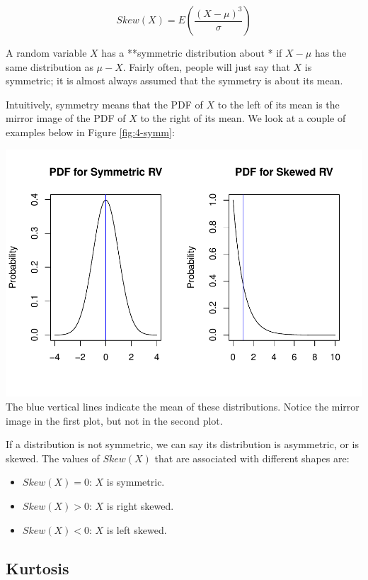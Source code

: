 \documentclass[
]{book}
\providecommand{\tightlist}{%
  \setlength{\itemsep}{0pt}\setlength{\parskip}{0pt}}
\begin{document}
\begin{equation} 
Skew(X) = E \left(\frac{(X-\mu)^3}{\sigma} \right)
\label{eq:4-skew}
\end{equation}

A random variable \(X\) has a **symmetric distribution about \mu** if \(X - \mu\) has the same distribution as \(\mu - X\). Fairly often, people will just say that \(X\) is symmetric; it is almost always assumed that the symmetry is about its mean.

Intuitively, symmetry means that the PDF of \(X\) to the left of its mean is the mirror image of the PDF of \(X\) to the right of its mean. We look at a couple of examples below in Figure \ref{fig:4-symm}:

\includegraphics{bookdown-demo_files/figure-latex/4-symm-1.pdf}
The blue vertical lines indicate the mean of these distributions. Notice the mirror image in the first plot, but not in the second plot.

If a distribution is not symmetric, we can say its distribution is asymmetric, or is skewed. The values of \(Skew(X)\) that are associated with different shapes are:

\begin{itemize}
\tightlist
\item
  \(Skew(X) = 0\): \(X\) is symmetric.
\item
  \(Skew(X) > 0\): \(X\) is right skewed.
\item
  \(Skew(X) < 0\): \(X\) is left skewed.
\end{itemize}

\subsection{Kurtosis}\label{kurtosis}
\end{document}
